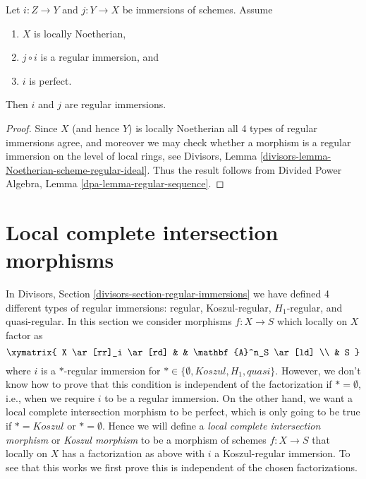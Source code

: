 \begin{lemma}
\label{lemma-factor-regular-immersion}
Let $i : Z \to Y$ and $j : Y \to X$ be immersions of schemes.
Assume
\begin{enumerate}
\item $X$ is locally Noetherian,
\item $j \circ i$ is a regular immersion, and
\item $i$ is perfect.
\end{enumerate}
Then $i$ and $j$ are regular immersions.
\end{lemma}

\begin{proof}
Since $X$ (and hence $Y$) is locally Noetherian all 4 types of regular
immersions agree, and moreover we may check whether a morphism is a
regular immersion on the level of local rings, see
Divisors, Lemma \ref{divisors-lemma-Noetherian-scheme-regular-ideal}.
Thus the result follows from
Divided Power Algebra, Lemma \ref{dpa-lemma-regular-sequence}.
\end{proof}









\section{Local complete intersection morphisms}
\label{section-lci}

\noindent
In
Divisors, Section \ref{divisors-section-regular-immersions}
we have defined 4 different types of regular immersions: regular,
Koszul-regular, $H_1$-regular, and quasi-regular. In this section
we consider morphisms $f : X \to S$ which locally on $X$ factor as
$$
\xymatrix{
X \ar[rr]_i \ar[rd] & & \mathbf{A}^n_S \ar[ld] \\
& S
}
$$
where $i$ is a $*$-regular immersion for
$* \in \{\emptyset, Koszul, H_1, quasi\}$.
However, we don't know how to prove that this condition is independent
of the factorization if $* = \emptyset$, i.e., when we require $i$ to
be a regular immersion. On the other hand, we want a
local complete intersection morphism to be perfect, which is only
going to be true if $* = Koszul$ or $* = \emptyset$. Hence we will define a
{\it local complete intersection morphism} or
{\it Koszul morphism} to be a morphism of schemes $f : X \to S$
that locally on $X$ has a factorization as above with $i$ a Koszul-regular
immersion. To see that this works we first prove this is independent
of the chosen factorizations.

